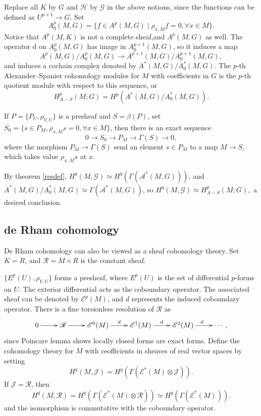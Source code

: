\documentclass[twoside]{article}
\begin{document}
 Replace all $K$ by $G$ and $\mathscr{H}$ by $\mathscr{G}$ in the above notions, since the functions can be defined as $U^{p+1}\to G$. Set $$A_0^p(M,G)=\{f\in A^p(M,G)\mid \rho_{x,M}f=0,\forall x\in M\}.$$
 Notice that  $A^p(M,K)$ is not a complete sheaf,and  $A^p(M,G)$ as well. The operator d on $A_0^p(M,G)$ has image in $A_0^{p+1}(M,G)$, so it induces a map $$
 A^p(M,G)/A_0^p(M,G)\to A^{p+1}(M,G)/A_0^{p+1}(M,G),
 $$
and induces a cochain complex denoted by $A^*(M,G)/A_0^*(M,G)$. The $p$-th Alexander--Spanier cohomology modules for $M$ with coefficients in $G$ is the $p$-th quotient module with respect to this sequence, or
$$
H_{A-S}^p(M;G)=H^p(A^*(M,G)/A_0^*(M,G)).
$$
\begin{lemma}
  If $P=\{P_U,\rho_{V,U}\}$ is a presheaf and $S=\beta(P)$, set $S_0=\{s\in P_M,\rho_{x,M}s=0,\forall x\in M\}$, then there is an exact sequence $$
  0\to S_0\to P_M\to \Gamma(S)\to 0,
  $$
  where the morphism $P_M\to \Gamma(S)$ send an element $s\in P_M$ to a map $M\to S$, which takes value $\rho_{x,M}s$ at $x$.
\end{lemma}

By theorem \ref{resdef}, $H^q(M,\mathscr{G})\simeq H^q(\Gamma(\mathscr{A}^*(M,G)))$, and $A^*(M,G)/A_0^*(M,G)\simeq \Gamma(\mathscr{A}^*(M,G))$, so $H^q(M,\mathscr{G})\simeq H_{A-S}^p(M;G),$ a desired conclusion.

\subsection{de Rham cohomology}
De Rham cohomology can also be viewed  as a sheaf cohomology theory. Set $K=R$, and $\mathscr{R}=M\times R$ is  the constant sheaf.

$\{E^p(U),\rho_{V,U}\}$ forms a presheaf, where $E^p(U)$ is the set of differential $p$-forms on $U$. The exterior differential acts as the coboundary operator. The associated sheaf can be denoted by $\mathscr{E}^p(M)$, and $d$ represents the induced coboundary operator. There is a fine torsionless resolution of $\mathscr{R}$ as \begin{equation*}
  \xymatrix{
  0\ar[r]&\mathscr{R}\ar[r]&\mathscr{E}^0(M)\ar[r]^d&\mathscr{E}^1(M)\ar[r]^d&\mathscr{E}^2(M)\ar[r]^d&\cdots,
  }
\end{equation*}
 since Poincare lemma shows locally closed forms are exact forms. Define the cohomology theory for $M$ with ceofficients in sheaves of real vector spaces by setting $$
 H^q(M,\mathscr{J})=H^q(\Gamma(\mathscr{E}^*(M)\otimes \mathscr{J})).
 $$
If $\mathscr{J}=\mathscr{R}$, then $$
 H^q(M,\mathscr{R})=H^q(\Gamma(\mathscr{E}^*(M)\otimes \mathscr{R}))\simeq H^q(\Gamma(\mathscr{E}^*(M))).
 $$
 and the isomorphism is commutative with the coboundary operator.
\end{document}
